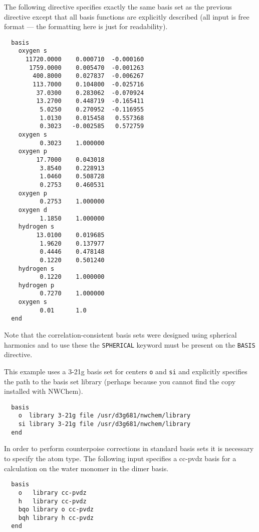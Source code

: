 The following directive specifies exactly the same basis set as the
previous directive except that all basis functions are explicitly
described (all input is free format --- the formatting here is just
for readability).
\begin{verbatim}
  basis
    oxygen s
      11720.0000    0.000710  -0.000160
       1759.0000    0.005470  -0.001263
        400.8000    0.027837  -0.006267
        113.7000    0.104800  -0.025716
         37.0300    0.283062  -0.070924
         13.2700    0.448719  -0.165411
          5.0250    0.270952  -0.116955
          1.0130    0.015458   0.557368
          0.3023   -0.002585   0.572759
    oxygen s                
          0.3023    1.000000
    oxygen p                
         17.7000    0.043018
          3.8540    0.228913
          1.0460    0.508728
          0.2753    0.460531
    oxygen p                
          0.2753    1.000000
    oxygen d
          1.1850    1.000000
    hydrogen s
         13.0100    0.019685
          1.9620    0.137977
          0.4446    0.478148
          0.1220    0.501240
    hydrogen s  
          0.1220    1.000000
    hydrogen p  
          0.7270    1.000000
    oxygen s
          0.01      1.0
  end
\end{verbatim}
Note that the correlation-consistent basis sets were designed using
spherical harmonics and to use these the \verb+SPHERICAL+ keyword must
be present on the \verb+BASIS+ directive.
    
This example uses a 3-21g basis set for centers \verb+o+ and \verb+si+
and explicitly specifies the path to the basis set library (perhaps
because you cannot find the copy installed with NWChem).
\begin{verbatim}
  basis
    o  library 3-21g file /usr/d3g681/nwchem/library
    si library 3-21g file /usr/d3g681/nwchem/library
  end
\end{verbatim}

In order to perform counterpoise corrections in standard basis sets it
is necessary to specify the atom type.  The following input specifies a
cc-pvdz basis for a calculation on the water monomer in the dimer basis.
\begin{verbatim}
  basis
    o   library cc-pvdz
    h   library cc-pvdz
    bqo library o cc-pvdz
    bqh library h cc-pvdz
  end
\end{verbatim}
